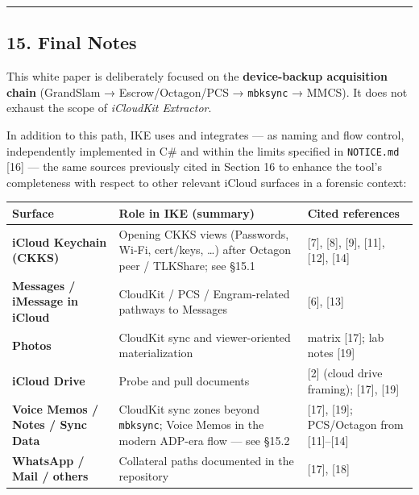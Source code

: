 \documentclass[
  english,
  10pt]{article}
\newcounter{none} %
\begin{document}
\begin{center}\rule{0.5\linewidth}{0.5pt}\end{center}

\subsection{15. Final Notes}\label{final-notes}

This white paper is deliberately focused on the \textbf{device-backup
acquisition chain} (GrandSlam → Escrow/Octagon/PCS → \texttt{mbksync} →
MMCS). It does not exhaust the scope of \emph{iCloudKit Extractor}.

In addition to this path, IKE uses and integrates --- as naming and flow
control, independently implemented in C\# and within the limits
specified in \texttt{NOTICE.md} {[}16{]} --- the same sources previously
cited in Section 16 to enhance the tool's completeness with respect to
other relevant iCloud surfaces in a forensic context:

{\def\LTcaptype{none} %
\begin{longtable}[]{@{}
  >{\raggedright\arraybackslash}p{}
  >{\raggedright\arraybackslash}p{}
  >{\raggedright\arraybackslash}p{}@{}}
\toprule\noalign{}
\begin{minipage}[b]{\linewidth}\raggedright
Surface
\end{minipage} & \begin{minipage}[b]{\linewidth}\raggedright
Role in IKE (summary)
\end{minipage} & \begin{minipage}[b]{\linewidth}\raggedright
Cited references
\end{minipage} \\
\midrule\noalign{}
\endhead
\bottomrule\noalign{}
\endlastfoot
\textbf{iCloud Keychain (CKKS)} & Opening CKKS views (Passwords, Wi‑Fi,
cert/keys, \ldots) after Octagon peer / TLKShare; see §15.1 & {[}7{]},
{[}8{]}, {[}9{]}, {[}11{]}, {[}12{]}, {[}14{]} \\
\textbf{Messages / iMessage in iCloud} & CloudKit / PCS / Engram-related
pathways to Messages & {[}6{]}, {[}13{]} \\
\textbf{Photos} & CloudKit sync and viewer-oriented materialization &
matrix {[}17{]}; lab notes {[}19{]} \\
\textbf{iCloud Drive} & Probe and pull documents & {[}2{]} (cloud drive
framing); {[}17{]}, {[}19{]} \\
\textbf{Voice Memos / Notes / Sync Data} & CloudKit sync zones beyond
\texttt{mbksync}; Voice Memos in the modern ADP-era flow --- see §15.2 &
{[}17{]}, {[}19{]}; PCS/Octagon from {[}11{]}--{[}14{]} \\
\textbf{WhatsApp / Mail / others} & Collateral paths documented in the
repository & {[}17{]}, {[}18{]} \\
\end{longtable}
}
\end{document}
